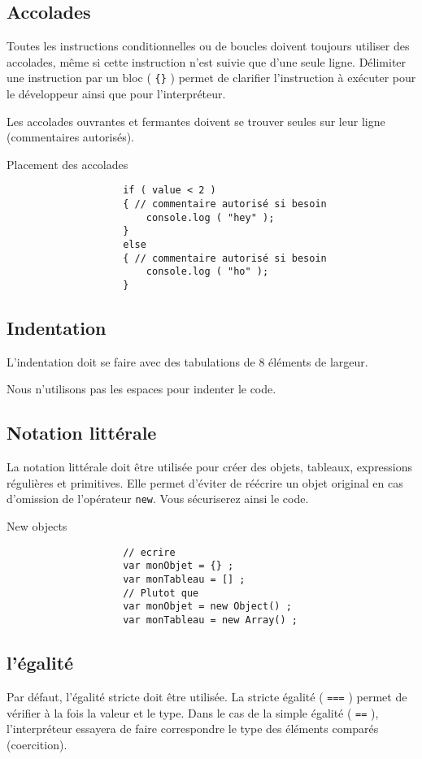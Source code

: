 		\subsection{Accolades}
			Toutes les instructions conditionnelles ou de boucles doivent toujours utiliser des accolades, même si cette instruction n'est suivie que d'une seule ligne. Délimiter une instruction par un bloc ( \verb+{}+ ) permet de clarifier l'instruction à exécuter pour le développeur ainsi que pour l'interpréteur.

			Les accolades ouvrantes et fermantes doivent se trouver seules sur leur ligne (commentaires autorisés).

			\begin{cbox}{Placement des accolades}
				\begin{verbatim}
					if ( value < 2 )
					{ // commentaire autorisé si besoin
					    console.log ( "hey" );
					}
					else
					{ // commentaire autorisé si besoin
					    console.log ( "ho" );
					}
				\end{verbatim}
			\end{cbox}

		\subsection{Indentation}
			L'indentation doit se faire avec des tabulations de 8 éléments de largeur.

			Nous n'utilisons pas les espaces pour indenter le code.

		\subsection{Notation littérale}
			La notation littérale doit être utilisée pour créer des objets, tableaux, expressions régulières et primitives. Elle permet d'éviter de réécrire un objet original en cas d'omission de l'opérateur \verb+new+. Vous sécuriserez ainsi le code.

			\begin{cbox}{New objects}
				\begin{verbatim}
					// ecrire
					var monObjet = {} ;
					var monTableau = [] ;
					// Plutot que
					var monObjet = new Object() ;
					var monTableau = new Array() ;
				\end{verbatim}
			\end{cbox}

		\subsection{l'égalité}
			Par défaut, l'égalité stricte doit être utilisée. La stricte égalité ( \verb+===+ ) permet de vérifier à la fois la valeur et le type. Dans le cas de la simple égalité ( \verb+==+ ), l'interpréteur essayera de faire correspondre le type des éléments comparés (coercition).

